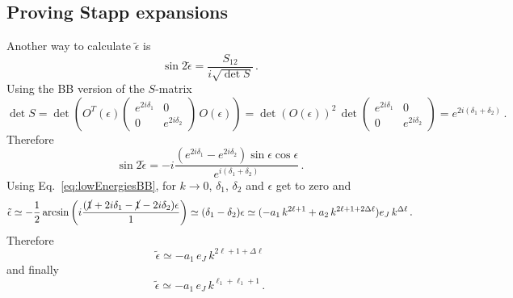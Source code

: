 \documentclass[10pt,a4paper]{article}
\newcommand{\eq}[1]{Eq.~#1}
\begin{document}
	
	
	
	
	
	
	
		
	\begin{appendices}
	\newcommand{\teps}{\tilde{\epsilon}}
	\newcommand{\tdone}{\tilde{\delta}_1}
	\newcommand{\tdtwo}{\tilde{\delta}_2}
	\section{Proving Stapp expansions}
		Another way to calculate $\tilde{\epsilon}$ is 
		\begin{equation}
			\sin2\teps = 
			\frac{S_{12}}{i\sqrt{\det S}}\,.
		\end{equation}	
		Using the BB version of the $S$-matrix
		\begin{equation}
			\det S = \det\left(O^T(\epsilon)
			\begin{pmatrix}
				e^{2i\delta_1} & 0 \\
				0 & e^{2i\delta_2}
			\end{pmatrix}\,
			O(\epsilon)
			\right)
			=
			\det\left(O(\epsilon)\right)^2\,
			\det\begin{pmatrix}
				e^{2i\delta_1} & 0 \\
				0 & e^{2i\delta_2}
			\end{pmatrix}
			=
			e^{2i(\delta_1+\delta_2)}\,.
		\end{equation}
		Therefore
		\begin{equation}
			\sin2\teps = 
			-i\frac{(e^{2i\delta_1}-e^{2i\delta_2})\sin\epsilon\cos\epsilon}{e^{i(\delta_1+\delta_2)}}\,.
		\end{equation}	
		Using \eq{\eqref{eq:lowEnergiesBB}}, for $k\rightarrow 0$, $\delta_1$, $\delta_2$ and $\epsilon$ get to zero and
		\begin{equation}
			\teps \simeq -\frac{1}{2}\arcsin\left(
			i\frac{(\cancel{1}+2i\delta_1-\cancel{1}-2i\delta_2)\epsilon}{1}
			\right)
			\simeq
			(\delta_1-\delta_2)\epsilon
			\simeq 
			(-a_1\,k^{2\ell+1}+a_2\,k^{2\ell+1+2\Delta\ell})e_J\,k^{\Delta\ell}\,.
		\end{equation}
		Therefore
		\begin{equation}
			\teps \simeq -a_1\,e_J\,k^{2\ell+1+\Delta\ell}
		\end{equation}
		and finally
		\begin{equation}
			\teps \simeq -a_1 \,e_J\,k^{\ell_1+\ell_1+1}\,.
			\label{eq:tildeepsilon}
		\end{equation}
		

\end{appendices}
\end{document}
